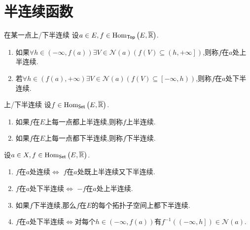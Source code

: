 \section{半连续函数}

\begin{definition}{在某一点上/下半连续}{}
	设$a\in E,f\in\operatorname{Hom}_{\mathsf{Top}}\left(E,\overline{\mathbb{R}}\right)$.
	\begin{enumerate}
		\item 如果$\forall h\in\left(-\infty,f\left(a\right)\right)\exists V\in\mathcal{N}\left(a\right)\left(f\left(V\right)\subseteq\left(h,+\infty\right]\right)$,则称$f$在$a$处上半连续.
		\item 若$\forall h\in\left(f\left(a\right),+\infty\right)\exists V\in\mathcal{N}\left(a\right)\left(f\left(V\right)\subseteq\left[-\infty,h\right)\right)$,则称$f$在$a$处下半连续.
	\end{enumerate}
\end{definition}

\begin{definition}{上/下半连续}{}
	设$f\in\operatorname{Hom}_{\mathsf{Set}}\left(E,\overline{\mathbb{R}}\right)$.
	\begin{enumerate}
		\item 如果$f$在$E$上每一点都上半连续,则称$f$上半连续.
		\item 如果$f$在$E$上每一点都下半连续,则称$f$下半连续.
	\end{enumerate}
\end{definition}

\begin{proposition}{}{}
	设$a\in X,f\in\operatorname{Hom}_{\mathsf{Set}}\left(E,\overline{\mathbb{R}}\right)$.
	\begin{enumerate}
		\item $f$在$a$处连续$\iff$ $f$在$a$处既上半连续又下半连续.
		\item $f$在$a$处下半连续$\iff$ $-f$在$a$处上半连续.
		\item 如果$f$下半连续,那么$f$在$E$的每个拓扑子空间上都下半连续.
		\item $f$在$a$处下半连续$\iff$对每个$h\in\left(-\infty,f\left(a\right)\right)$有$f^{-1}\left(\left(-\infty,h\right]\right)\in\mathcal{N}\left(a\right)$.
	\end{enumerate}
\end{proposition}

